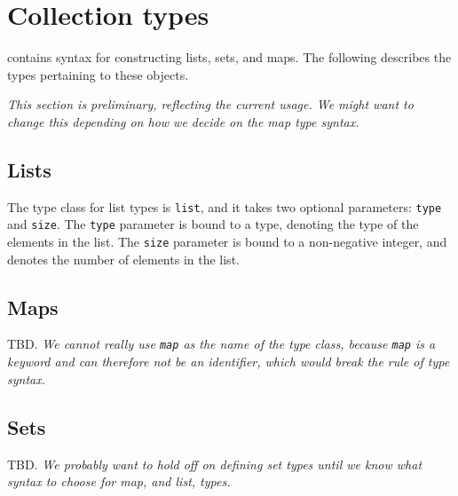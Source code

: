 
\section{Collection types}

\Cal contains syntax for constructing lists, sets, and maps. The
following describes the types pertaining to these objects.

{\em This section is preliminary, reflecting the current usage. We might want to change this depending on how we decide on the map type syntax.}
\subsection{Lists}

The type class for list types is {\tt list}, and it takes two optional
parameters: {\tt type} and {\tt size}. The {\tt type} parameter is
bound to a type, denoting the type of the elements in the list. The
{\tt size} parameter is bound to a non-negative integer, and denotes
the number of elements in the list.

\subsection{Maps}

TBD. {\em We cannot really use {\tt map} as the name of the type
  class, because {\tt map} is a keyword and can therefore not be an
  identifier, which would break the rule of type syntax.}

\subsection{Sets}

TBD. {\em We probably want to hold off on defining set types until we
  know what syntax to choose for map, and list, types.}









